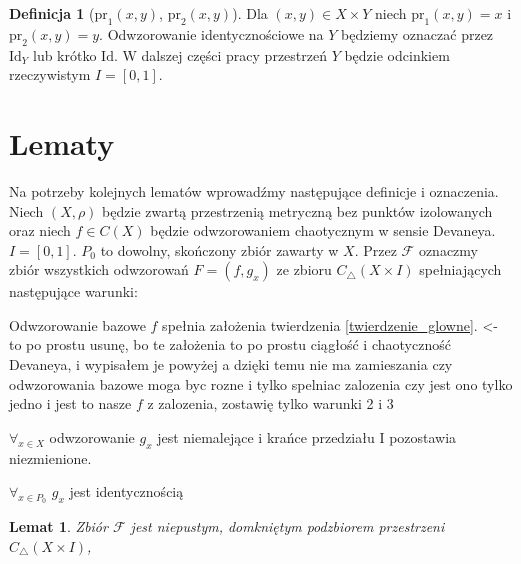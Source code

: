 \documentclass[licencjacka]{pwr_wmat_praca_dyplomowa}
\theoremstyle{plain}
\numberwithin{theorem}{chapter}
\newtheorem{lemma}[theorem]{Lemat}
\theoremstyle{definition}
\numberwithin{theorem}{chapter}
\newtheorem{definition}[theorem]{Definicja}
\begin{document}
\begin{definition}[$\textrm{pr}_1(x, y)$, $\textrm{pr}_2(x, y)$]
Dla $(x, y) \in X \times Y$ niech $\textrm{pr}_1(x, y) = x$ i $\textrm{pr}_2(x, y) = y$. Odwzorowanie identycznościowe na $Y$ będziemy oznaczać przez $\textrm{Id}_Y$ lub krótko $\textrm{Id}$. W dalszej części pracy przestrzeń $Y$ będzie odcinkiem rzeczywistym $I = [0, 1]$.
\end{definition}





\section{Lematy}

Na potrzeby kolejnych lematów wprowadźmy następujące definicje i oznaczenia.
Niech $(X, \rho)$ będzie zwartą przestrzenią metryczną bez punktów izolowanych oraz niech $f \in C(X)$ będzie odwzorowaniem chaotycznym w sensie Devaneya.
$I = [0, 1].$
$P_0$ to dowolny, skończony zbiór zawarty w $X.$ Przez $\mathcal{F}$ oznaczmy zbiór wszystkich odwzorowań $F = (f, g_x)$ ze zbioru $C_\triangle(X \times I)$ spełniających następujące warunki:
\begin{enumerate}
{\color{red}\item Odwzorowanie bazowe $f$ spełnia założenia twierdzenia \ref{twierdzenie_glowne}. <- to po prostu usunę, bo te założenia to po prostu ciągłość i chaotyczność Devaneya, i wypisałem je powyżej a dzięki temu nie ma zamieszania czy odwzorowania bazowe moga byc rozne i tylko spelniac zalozenia czy jest ono tylko jedno i jest to nasze $f$ z zalozenia, zostawię tylko warunki 2 i 3}
\item $\forall_{x \in X}$ odwzorowanie $g_x$ jest niemalejące i krańce przedziału I pozostawia niezmienione.
\item $\forall_{x \in P_0}$ $g_x$ jest identycznością 
\end{enumerate}


\begin{lemma} \label{F_jest_niepustym_domknietym_podzbiorem_trojkatnych}
Zbiór $\mathcal{F}$ jest niepustym, domkniętym podzbiorem przestrzeni $C_{\triangle}(X \times I)$, 
\end{lemma}
\end{document}
